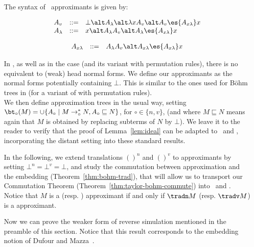 \begin{definition} The syntax of \dcbv\ approximants is given by:

\begin{minipage}{0.45\textwidth}
$$\begin{array}{lll}
	A_v & ::= & \bot\alt A_{\lambda } \alt \lambda x A_v \alt A_v\es{A_{x\lambda }}x \\
	A_{\lambda} & ::= &  x  \alt A_{\lambda} A_v \alt A_{\lambda
	}\es{A_{x\lambda }}x \\
\end{array}$$		
\end{minipage}
%
\begin{minipage}{0.54\textwidth}
	$$\begin{array}{lll}
	A_{x\lambda } & ::= & A_{\lambda } A_v   \alt
	 A_{x\lambda }
	\es{A_{x\lambda }}x
\end{array}$$
\end{minipage}

\end{definition}
In \dcbv{}, as well as in the \cbv{} case (and its variant with permutation rules), there is no equivalent to (weak) head normal forms. We define our approximants as the normal forms potentially containing $\bot$. This is similar to the ones used for Böhm trees in \cite{kerinec:bohmTreeCbV} (for a variant of \cbv{} with permutation rules).\\ 

We then define approximation trees in the usual way, setting
$\bt_\circ(M)=\cup\{A_\circ\mid M\to_\circ^*N,A_\circ\sqsubseteq N\}$, for $\circ\in\{n,v\}$,
(and where $M\sqsubseteq N$ means again that $M$ is obtained by replacing subterms of
$N$ by $\bot$). We leave it to the reader to
verify that the proof of Lemma~\ref{lem:ideal} can be adapted to \dcbv\ and
\dcbn, incorporating the distant setting into these standard
results.

In the following, we extend translations $()^n$ and $()^v$ to
approximants by setting $\bot^n=\bot^v=\bot$, and study the
commutation between approximation and the embedding
(Theorem~\ref{thm:bohm-trad}), that will allow us to transport our
Commutation Theorem (Theorem~\ref{thm:taylor-bohm-commute}) into
\dcbv\ and \dcbn. Notice that $M$ is a \dcbn{} (resp. \dcbv{})
approximant if and only if $\tradn M$ (resp. $\tradv M$) is a \dbang{}
approximant.

Now we can prove the weaker form of reverse simulation mentioned in the preamble of
this section. Notice that this result corresponds to the 
embedding notion of Dufour and Mazza~\cite{mazza-dufour}.


